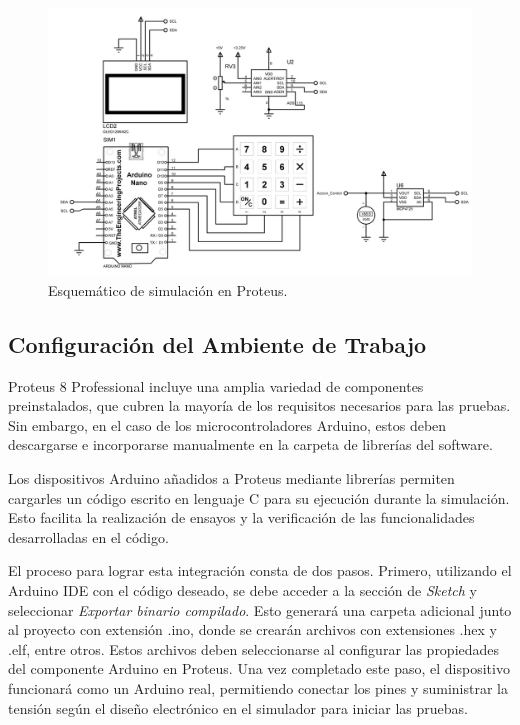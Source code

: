 \begin{figure}[H]
    \centering
    \includegraphics[scale=0.4]{./imagenes/proteus_esquema2.jpg}
    \caption{Esquemático de simulación en Proteus.}
    \label{F:esquematico_proteus}
\end{figure}

\subsection{Configuración del Ambiente de Trabajo}

Proteus 8 Professional incluye una amplia variedad de componentes preinstalados, que cubren la mayoría de los requisitos necesarios para las pruebas. Sin embargo, en el caso de los microcontroladores Arduino, estos deben descargarse e incorporarse manualmente en la carpeta de librerías del software. \par 
Los dispositivos Arduino añadidos a Proteus mediante librerías permiten cargarles un código escrito en lenguaje C para su ejecución durante la simulación. Esto facilita la realización de ensayos y la verificación de las funcionalidades desarrolladas en el código. \par 
El proceso para lograr esta integración consta de dos pasos. Primero, utilizando el Arduino IDE con el código deseado, se debe acceder a la sección de \textit{Sketch} y seleccionar \textit{Exportar binario compilado}. Esto generará una carpeta adicional junto al proyecto con extensión .ino, donde se crearán archivos con extensiones .hex y .elf, entre otros. Estos archivos deben seleccionarse al configurar las propiedades del componente Arduino en Proteus. Una vez completado este paso, el dispositivo funcionará como un Arduino real, permitiendo conectar los pines y suministrar la tensión según el diseño electrónico en el simulador para iniciar las pruebas.

